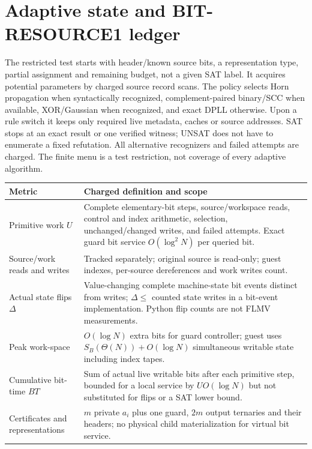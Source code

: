 \documentclass[11pt]{article}
\begin{document}
\section{Adaptive state and BIT-RESOURCE1 ledger}
The restricted test starts with header/known source bits, a representation type, partial assignment and remaining budget, not a given SAT label. It acquires potential parameters by charged source record scans. The policy selects Horn propagation when syntactically recognized, complement-paired binary/SCC when available, XOR/Gaussian when recognized, and exact DPLL otherwise. Upon a rule switch it keeps only required live metadata, caches or source addresses. SAT stops at an exact result or one verified witness; UNSAT does not have to enumerate a fixed refutation. All alternative recognizers and failed attempts are charged. The finite menu is a test restriction, not coverage of every adaptive algorithm.

\begin{center}\small
\begin{tabularx}{\linewidth}{lX}
\toprule
Metric & Charged definition and scope\\ \midrule
Primitive work $U$ & Complete elementary-bit steps, source/workspace reads, control and index arithmetic, selection, unchanged/changed writes, and failed attempts. Exact guard bit service $O(\log^2 N)$ per queried bit.\\
Source/work reads and writes & Tracked separately; original source is read-only; guest indexes, per-source dereferences and work writes count.\\
Actual state flips $\Delta$ & Value-changing complete machine-state bit events distinct from writes; $\Delta\le$ counted state writes in a bit-event implementation. Python flip counts are not FLMV measurements.\\
Peak work-space & $O(\log N)$ extra bits for guard controller; guest uses $S_B(\Theta(N))+O(\log N)$ simultaneous writable state including index tapes.\\
Cumulative bit-time $BT$ & Sum of actual live writable bits after each primitive step, bounded for a local service by $U O(\log N)$ but not substituted for flips or a SAT lower bound.\\
Certificates and representations & $m$ private $a_i$ plus one guard, $2m$ output ternaries and their headers; no physical child materialization for virtual bit service.\\
\bottomrule
\end{tabularx}
\end{center}
\end{document}
